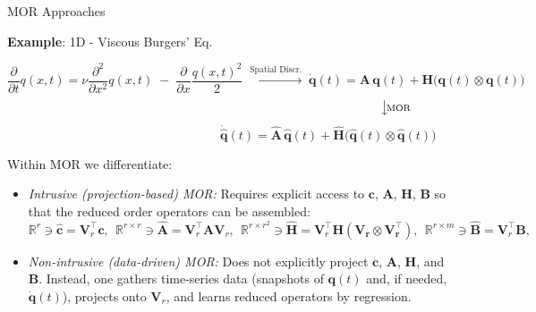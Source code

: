 \begin{frame}{MOR Approaches}

\textbf{Example}: 1D - Viscous Burgers' Eq.

\[
  \frac{\partial}{\partial t}q(x,t)
  = \nu \frac{\partial^2}{\partial x^2}q(x,t)
    \;-\;\frac{\partial}{\partial x}
      \frac{q(x,t)^2}{2}
  \;\xrightarrow{\text{Spatial Discr.}}\;
  \dot{\mathbf{q}}(t)
  = \mathbf{A}\,\mathbf{q}(t)
    + \mathbf{H}\bigl(\mathbf{q}(t)\otimes\mathbf{q}(t)\bigr)
\]
\vspace{-0.5cm}
\[
  \hspace{9.2cm}\bigl\downarrow\!\scriptstyle\text{MOR}\bigr.
\]
\[
  ~~~~~~~~~~~~~~~~~~~~~~~~~~~~~~~~~~~~~~~~~~~~~~~~~~~~~~~~~~~~~~~~~~~~~\dot{\hat{\mathbf{q}}}(t)
  = \hat{\mathbf{A}}\,\hat{\mathbf{q}}(t)
    + \hat{\mathbf{H}}\bigl(\hat{\mathbf{q}}(t)\otimes\hat{\mathbf{q}}(t)\bigr)
\]

\vspace{-0.3cm}
Within MOR we differentiate:
\vspace{0.1cm}
    \begin{itemize}
        \item \textcolor{codeblue}{\emph{Intrusive (projection-based) MOR:}} Requires explicit access to $\mathbf{c}$, $\mathbf{A}$, $\mathbf{H}$, $\mathbf{B}$ so that the reduced order operators can be assembled:{\small
        $$\mathbb{R}^r \ni\hat{\mathbf{c}}=\mathbf{V}_r^{\top}\mathbf{c},~~\mathbb{R}^{r\times r} \ni\hat{\mathbf{A}}=\mathbf{V}_r^{\top}\mathbf{A}\mathbf{V}_r^{},~~\mathbb{R}^{r\times r^2} \ni\hat{\mathbf{H}}=\mathbf{V}_r^{\top}\mathbf{H(\mathbf{V}_r^{}\otimes\mathbf{V}_r^{\top})},~~\mathbb{R}^{r\times m} \ni\hat{\mathbf{B}}=\mathbf{V}_r^{\top}\mathbf{B},$$}
        \item \textcolor{codeblue}{\emph{Non-intrusive (data-driven) MOR:}} Does not explicitly project $\mathbf{c}$, $\mathbf{A}$, $\mathbf{H}$, and $\mathbf{B}$. Instead, one gathers time-series data (snapshots of $\mathbf{q}(t)$ and, if needed, $\dot{\mathbf{q}}(t)$), projects onto $\mathbf{V}_r$, and learns reduced operators by regression.
    \end{itemize}
  
\end{frame}